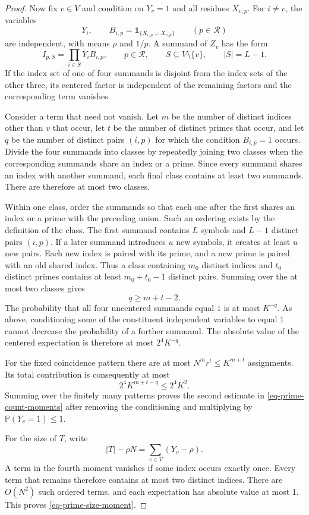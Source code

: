\documentclass[11pt,reqno]{amsart}
\numberwithin{equation}{section}
\begin{document}
\begin{proof}
Now fix $v\in V$ and condition on $Y_v=1$ and all residues $X_{v,p}$. For $i\ne v$, the variables
\[
 Y_i,
 \qquad
 B_{i,p}=\mathbf1_{\{X_{i,p}=X_{v,p}\}}
 \qquad(p\in\mathcal R)
\]
are independent, with means $\rho$ and $1/p$. A summand of $Z_v$ has the form
\[
 I_{p,S}=\prod_{i\in S}Y_iB_{i,p},
 \qquad
 p\in\mathcal R,
 \qquad
 S\subseteq V\setminus\{v\},
 \qquad
 |S|=L-1.
\]
If the index set of one of four summands is disjoint from the index sets of the other three, its centered factor is independent of the remaining factors and the corresponding term vanishes.

Consider a term that need not vanish. Let $m$ be the number of distinct indices other than $v$ that occur, let $t$ be the number of distinct primes that occur, and let $q$ be the number of distinct pairs $(i,p)$ for which the condition $B_{i,p}=1$ occurs. Divide the four summands into classes by repeatedly joining two classes when the corresponding summands share an index or a prime. Since every summand shares an index with another summand, each final class contains at least two summands. There are therefore at most two classes.

Within one class, order the summands so that each one after the first shares an index or a prime with the preceding union. Such an ordering exists by the definition of the class. The first summand contains $L$ symbols and $L-1$ distinct pairs $(i,p)$. If a later summand introduces $u$ new symbols, it creates at least $u$ new pairs. Each new index is paired with its prime, and a new prime is paired with an old shared index. Thus a class containing $m_0$ distinct indices and $t_0$ distinct primes contains at least $m_0+t_0-1$ distinct pairs. Summing over the at most two classes gives
\[
 q\ge m+t-2.
\]
The probability that all four uncentered summands equal $1$ is at most $K^{-q}$. As above, conditioning some of the constituent independent variables to equal $1$ cannot decrease the probability of a further summand. The absolute value of the centered expectation is therefore at most $2^4K^{-q}$.

For the fixed coincidence pattern there are at most $N^m r^t\le K^{m+t}$ assignments. Its total contribution is consequently at most
\[
 2^4K^{m+t-q}\le2^4K^2.
\]
Summing over the finitely many patterns proves the second estimate in \eqref{eq-prime-count-moments} after removing the conditioning and multiplying by $\mathbb P(Y_v=1)\le1$.

For the size of $T$, write
\[
 |T|-\rho N=\sum_{v\in V}(Y_v-\rho).
\]
A term in the fourth moment vanishes if some index occurs exactly once. Every term that remains therefore contains at most two distinct indices. There are $O(N^2)$ such ordered terms, and each expectation has absolute value at most $1$. This proves \eqref{eq-prime-size-moment}.


\end{proof}
\end{document}

